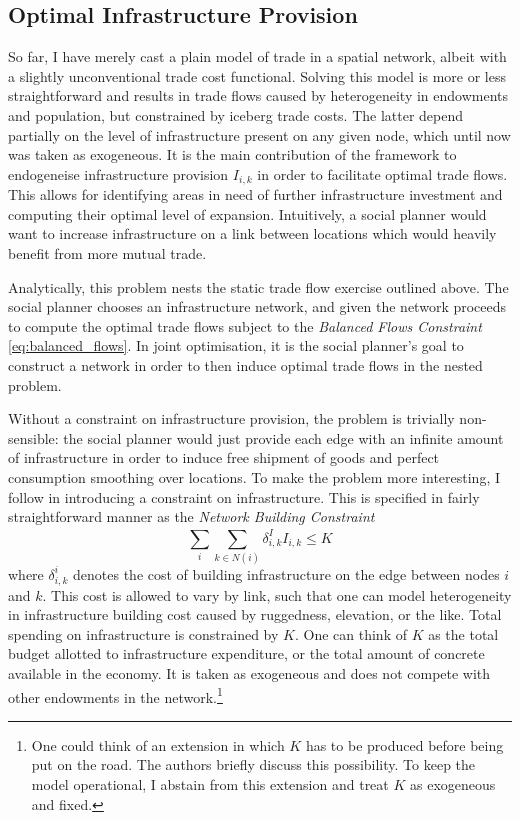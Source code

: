 \documentclass[11pt, oneside]{article}   	%
\begin{document}
\subsection{Optimal Infrastructure Provision}
So far, I have merely cast a plain model of trade in a spatial network, albeit with a slightly unconventional trade cost functional. Solving this model is more or less straightforward and results in trade flows caused by heterogeneity in endowments and population, but constrained by iceberg trade costs. The latter depend partially on the level of infrastructure present on any given node, which until now was taken as exogeneous. It is the main contribution of the \cite{fajgelbaum_optimal_2017} framework to endogeneise infrastructure provision $I_{i,k}$ in order to facilitate optimal trade flows. This allows for identifying areas in need of further infrastructure investment and computing their optimal level of expansion. Intuitively, a social planner would want to increase infrastructure on a link between locations which would heavily benefit from more mutual trade.

Analytically, this problem nests the static trade flow exercise outlined above. The social planner chooses an infrastructure network, and given the network proceeds to compute the optimal trade flows subject to the \emph{Balanced Flows Constraint} \eqref{eq:balanced_flows}. In joint optimisation, it is the social planner's goal to construct a network in order to then induce optimal trade flows in the nested problem.

Without a constraint on infrastructure provision, the problem is trivially non-sensible: the social planner would just provide each edge with an infinite amount of infrastructure in order to induce free shipment of goods and perfect consumption smoothing over locations. To make the problem more interesting, I follow \citeauthor{fajgelbaum_optimal_2017} in introducing a constraint on infrastructure. This is specified in fairly straightforward manner as the \emph{Network Building Constraint}
\begin{equation}
  \sum_{i}^{}\sum_{k\in N(i)}^{}\delta^{I}_{i,k}I_{i,k} \leq K
  \label{eq:network_building}
\end{equation}
where $\delta^{i}_{i,k}$ denotes the cost of building infrastructure on the edge between nodes $i$ and $k$. This cost is allowed to vary by link, such that one can model heterogeneity in infrastructure building cost caused by ruggedness, elevation, or the like. Total spending on infrastructure is constrained by $K$. One can think of $K$ as the total budget allotted to infrastructure expenditure, or the total amount of concrete available in the economy. It is taken as exogeneous and does not compete with other endowments in the network.\footnote{One could think of an extension in which $K$ has to be produced before being put on the road. The authors briefly discuss this possibility. To keep the model operational, I abstain from this extension and treat $K$ as exogeneous and fixed.}
\end{document}
